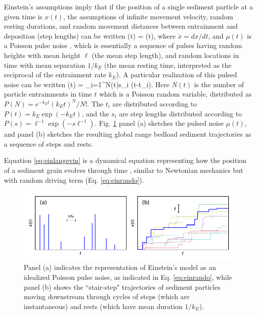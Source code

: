Einstein's assumptions imply that if the position of a single sediment particle at a given time is $x(t)$, the assumptions of infinite movement velocity, random resting durations, and random movement distances between entrainment and deposition (step lengths) can be written
\be {}(t) = \mu(t), \label{eq:einlangevin}\ee
where $\dot{x} = dx/dt$, and $\mu(t)$ is a Poisson pulse noise \citep{VanDenBroeck1983}, which is essentially a sequence of pulses having random heights with mean height $\ell$ (the mean step length), and random locations in time with mean separation $1/k_E$ (the mean resting time, interpreted as the reciprocal of the entrainment rate $k_E$).
A particular realization of this pulsed noise can be written
\be \mu(t) = \sum_{i=1}^{N(t)}s_i \delta(t-t_i). \label{eq:einrando} \ee
Here $N(t)$ is the number of particle entrainments in time $t$ which is  a Poisson random variable, distributed as $P(N) = e^{-k_E t} (k_E t)^N/N!$.
The $t_i$ are distributed according to $P(t) = k_E\exp(-k_E t)$, and the $s_i$ are step lengths distributed according to $P(s) = \ell^{-1}\exp(-s \ell^{-1}).$
Fig. \ref{fig:einsteinfig} panel (a) sketches the pulsed noise $\mu(t)$, and panel (b) sketches the resulting global range bedload sediment trajectories as a sequence of steps and rests.

Equation \ref{eq:einlangevin} is a dynamical equation representing how the position of a sediment grain evolves through time \citep{Kubo1978}, similar to Newtonian mechanics \citep{Goldstein1997} but with random driving term (Eq. \ref{eq:einrando}).
\begin{figure}[!htbp]
	\includegraphics[width=\linewidth,keepaspectratio]{./figures/ch1/einsteinConcept.pdf}
	\caption{Panel (a) indicates the representation of Einstein's model as an idealized Poisson pulse noise, as indicated in Eq. \ref{eq:einrando}, while panel (b) shows the ``stair-step" trajectories of sediment particles moving downstream through cycles of steps (which are instantaneous) and rests (which have mean duration $1/k_E$). }
	\label{fig:einsteinfig}
\end{figure}

